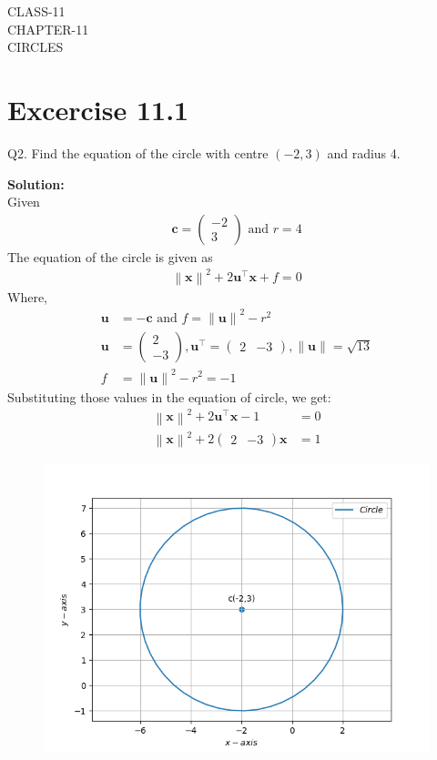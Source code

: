 \documentclass[12pt]{article}
\providecommand{\norm}[1]{\left\lVert#1\right\rVert}
\newcommand{\solution}{\noindent \textbf{Solution: }}
\newcommand{\myvec}[1]{\ensuremath{\begin{pmatrix}#1\end{pmatrix}}}
\let\vec\mathbf
\begin{document}
\begin{center}
\textbf\large{CLASS-11\\CHAPTER-11 \\ CIRCLES}

\end{center}
\section*{Excercise 11.1}

Q2. Find the equation of the circle with centre $(-2,3)$ and radius 4.

\solution
\\
Given
\begin{align}
	\vec{c} = \myvec{-2\\3} \text{ and } r = 4
\end{align}
The equation of the circle is given as
\begin{align}
	\norm{\vec{x}}^{2} + 2\vec{u}^{\top}\vec{x} + f = 0
\end{align}
Where,
\begin{align}
	\vec{u} &= -\vec{c} \text{ and } f = \norm{\vec{u}}^{2} - r^{2}\\
	\vec{u} &= \myvec{2\\-3},\vec{u}^\top=\myvec{2&-3},\norm{\vec{u}} = \sqrt{13}\\
	f &= \norm{\vec{u}}^2 - r^2= -1
\end{align}
Substituting those values in the equation of circle, we get:
\begin{align}
	\norm{\vec{x}}^2 + 2\vec{u}^\top\vec{x}-1 &= 0\\
	\norm{\vec{x}}^2 + 2\myvec{2&-3}\vec{x} &= 1    		       
\end{align}	
\begin{figure}[!h]
	\begin{center} 
	    \includegraphics[width=\columnwidth]{figs/circle.png}
	\end{center}
\caption{}
\label{fig:Fig1}
\end{figure}
\end{document}
